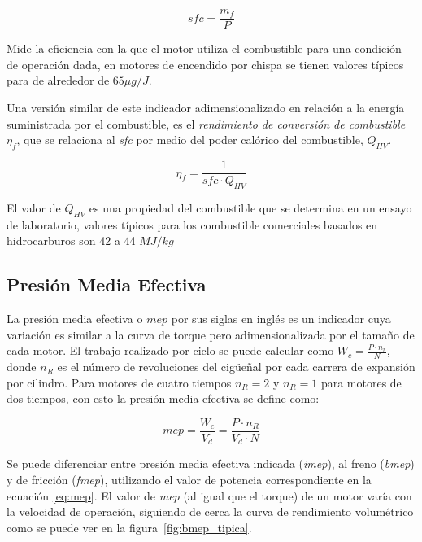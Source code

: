 \begin{equation}\label{eq:sfc} sfc = \frac{\dot{m_f}}{P}
\end{equation}

Mide la eficiencia con la que el motor utiliza el combustible para una condición
de operación dada, en motores de encendido por chispa se tienen valores típicos
para de alrededor de $65\mu g/J$.

Una versión similar de este indicador adimensionalizado en relación a la energía
suministrada por el combustible, es el \emph{rendimiento de conversión de
combustible} $\eta_f$, que se relaciona al \emph{sfc} por medio del poder
calórico del combustible, $Q_{HV}$.

\begin{equation}\label{eq:eta_f} \eta_f = \frac{1}{sfc \cdot Q_{HV}}
\end{equation}

El valor de $Q_{HV}$ es una propiedad del combustible que se determina en un
ensayo de laboratorio, valores típicos para los combustible comerciales basados
en hidrocarburos son 42 a 44 $MJ/kg$


\subsection{Presión Media Efectiva}
%
La presión media efectiva o $mep$ por sus siglas en inglés es un indicador cuya
variación es similar a la curva de torque pero adimensionalizada por el tamaño
de cada motor.
%
El trabajo realizado por ciclo se puede calcular como
$W_c = \frac{P \cdot n_r}{N}$, donde $n_R$ es el número de revoluciones del
cigüeñal por cada carrera de expansión por cilindro.
%
Para motores de cuatro tiempos $n_R=2$ y $n_R=1$ para motores de dos tiempos,
con esto la presión media efectiva se define como:

\begin{equation}\label{eq:mep} mep = \frac{W_{c}}{V_d} = \frac{P \cdot n_R}{V_d \cdot N}
\end{equation}

Se puede diferenciar entre presión media efectiva indicada (\emph{imep}), al
freno (\emph{bmep}) y de fricción (\emph{fmep}), utilizando el valor de potencia
correspondiente en la ecuación \ref{eq:mep}.
%
El valor de \emph{mep} (al igual que el torque) de un motor varía con la
velocidad de operación, siguiendo de cerca la curva de rendimiento volumétrico
como se puede ver en la figura~\ref{fig:bmep_tipica}.

